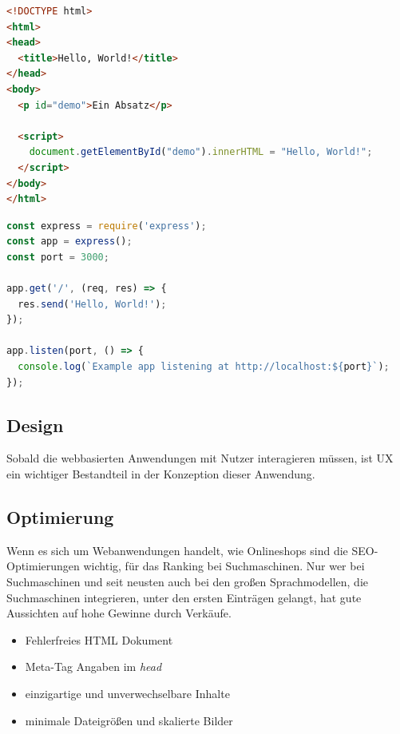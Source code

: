 \begin{lstlisting}[language=html,label=lst:hello_word_js_client,caption={Hello World in clientseitigen JavaScript}]
<!DOCTYPE html>
<html>
<head>
  <title>Hello, World!</title>
</head>
<body>
  <p id="demo">Ein Absatz</p>

  <script>
    document.getElementById("demo").innerHTML = "Hello, World!";
  </script>
</body>
</html>
\end{lstlisting}

\begin{lstlisting}[language=javascript,label=lst:hello_word_js_server,caption={Hello World in serverseitigem JavaScript}]
const express = require('express');
const app = express();
const port = 3000;

app.get('/', (req, res) => {
  res.send('Hello, World!');
});

app.listen(port, () => {
  console.log(`Example app listening at http://localhost:${port}`);
});
\end{lstlisting}

\subsection{Design}
Sobald die webbasierten Anwendungen mit Nutzer interagieren müssen, ist UX ein wichtiger Bestandteil in der Konzeption dieser Anwendung.


\subsection{Optimierung}
Wenn es sich um Webanwendungen handelt, wie Onlineshops sind die SEO-Optimierungen wichtig, für das Ranking bei Suchmaschinen. Nur wer bei Suchmaschinen und seit neusten auch bei den großen Sprachmodellen, die Suchmaschinen integrieren, unter den ersten Einträgen gelangt, hat gute Aussichten auf hohe Gewinne durch Verkäufe.

\begin{itemize}
	\item Fehlerfreies HTML Dokument
	\item Meta-Tag Angaben im \textit{head}
	\item einzigartige und unverwechselbare Inhalte
	\item minimale Dateigrößen und skalierte Bilder
\end{itemize}


